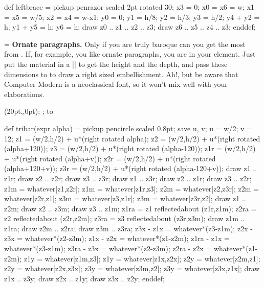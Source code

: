 
\MTcode
def leftbrace =
 pickup penrazor scaled 2pt rotated 30;
 x3 = 0; x0 = x6 = w; x1 = x5 = w/5; x2 = x4 = w-x1;
 y0 = 0; y1 = h/8; y2 = h/3; y3 = h/2;
 y4 + y2 = h; y1 + y5 = h; y6 = h;
 draw z0 .. z1 .. z2 .. z3;
 draw z6 .. z5 .. z4 .. z3;
enddef;

\def\beginbracedpar{\setbox0=\vbox\bgroup
 \leftskip=20pt }
\def\endbracedpar{\strut\par\egroup
 \MTbeginchar(20pt,\the\ht0,0pt);%
  \MTline{ leftbrace;}%
 \MTendchar;%
 \hbox to\hsize{\rlap{\box\MTbox}\box0\hss}}

\bigskip %

\beginbracedpar\noindent
{\bf Ornate paragraphs.} Only if you are truly baroque can you get the
most from {\MTeX}. If, for example, you like ornate paragraphs, you are
in your element. Just put the material in a |\vbox| to get the height
and the depth, and pass these dimensions to {\MF} to draw a right sized
embellishment. Ah!, but be aware that Computer Modern is a neoclassical
font, so it won't mix well with your elaborations.
\endbracedpar


\MTcode
 def tribar(expr alpha) =
  pickup pencircle scaled 0.8pt;
  save u, v; u = w/2; v = 12;
  z1 = (w/2,h/2) + u*(right rotated alpha);
  z2 = (w/2,h/2) + u*(right rotated (alpha+120));
  z3 = (w/2,h/2) + u*(right rotated (alpha-120));
  z1r = (w/2,h/2) + u*(right rotated (alpha+v));
  z2r = (w/2,h/2) + u*(right rotated (alpha+120+v));
  z3r = (w/2,h/2) + u*(right rotated (alpha-120+v));
  draw z1 .. z1r; draw z2 .. z2r; draw z3 .. z3r;
  draw z1 .. z3r; draw z2 .. z1r; draw z3 .. z2r;
  z1m = whatever[z1,z2r]; z1m = whatever[z1r,z3];
  z2m = whatever[z2,z3r]; z2m = whatever[z2r,z1];
  z3m = whatever[z3,z1r]; z3m = whatever[z3r,z2];
  draw z1 .. z2m; draw z2 .. z3m; draw z3 .. z1m;
  z1ra = z1 reflectedabout (z1r,z1m);
  z2ra = z2 reflectedabout (z2r,z2m);
  z3ra = z3 reflectedabout (z3r,z3m);
  draw z1m .. z1ra; draw z2m .. z2ra; draw z3m .. z3ra;
  z3x - z1x = whatever*(z3-z1m);
  z2x - z3x = whatever*(z2-z3m);
  z1x - z2x = whatever*(z1-z2m);
  z1ra - z1x = whatever*(z3-z1m);
  z3ra - z3x = whatever*(z2-z3m);
  z2ra - z2x = whatever*(z1-z2m);
  z1y = whatever[z1m,z3]; z1y = whatever[z1x,z2x];
  z2y = whatever[z2m,z1]; z2y = whatever[z2x,z3x];
  z3y = whatever[z3m,z2]; z3y = whatever[z3x,z1x];
  draw z1x .. z3y;
  draw z2x .. z1y;
  draw z3x .. z2y;
 enddef;

